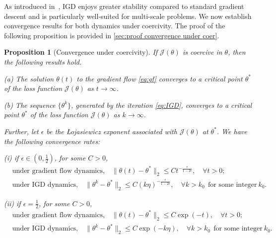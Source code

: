 \documentclass{article}
\newtheorem{proposition}{Proposition}
\begin{document}
As introduced in~\cite{IGD}, IGD enjoys greater stability compared to standard gradient descent and is particularly well-suited for multi-scale problems. 
We now establish convergence results for both dynamics under coercivity. The proof of the following proposition is provided in \cref{sec:proof convergence under coer}.
\iffalse
\begin{proposition}[Convergence under coercivity]\label{proposition:convergence under coer fi}
    If \(\mathcal{J}(\theta)\) is coercive in \(\theta\), then the following results hold.
       
    (a) The  solution $\theta(t)$ to the gradient flow \eqref{eq:gf} converges to a critical point $\theta^*$ of the loss function $\mathcal{J}(\theta)$ as $t\to \infty$.
       
    (b) The sequence \(\{\theta^{k}\}\), generated by the iteration \eqref{eq:IGD}, converges to a critical point $\theta^{*}$ of the loss function $\mathcal{J}(\theta)$ as \(k \to \infty\).

    Further, let $\epsilon$ be the \L{}ojasiewicz exponent associated with $\mathcal{J}(\theta)$ at $\theta^{*}$. We have the following convergence rates:
        
    (i) if $\epsilon \in (0,\frac{1}{2})$,  for some $C>0$,
        \begin{equation}
            \begin{aligned}
        &\text{under gradient flow dynamics,}\quad \|\theta(t)-\theta^{*}\|_{2} \leq C t^{-\frac{\epsilon}{1-2\epsilon}}, \quad \forall t>0 ;\\
        &\text{under IGD dynamics,}\quad \|\theta^k-\theta^{*}\|_{2} \leq C (k\eta)^{-\frac{\epsilon}{1-2\epsilon}}, \quad \forall k>k_0 \ \ \text{for some integer}\ k_0. 
        \end{aligned}
        \end{equation}
    
    (ii) if $\epsilon =\frac{1}{2}$,  for some $C>0$, 
    \begin{equation}
        \begin{aligned}
    &\text{under gradient flow dynamics,}\quad  \|\theta(t)-\theta^{*}\|_{2} \leq C \exp (-t),\quad \forall t>0 ;\\
    &\text{under IGD dynamics,}\quad \|\theta^k-\theta^{*}\|_{2} \leq C \exp (-k\eta), \quad \forall k>k_0 \ \ \text{for some integer}\ k_0. 
    \end{aligned}
    \end{equation}
\end{proposition}
\end{document}
